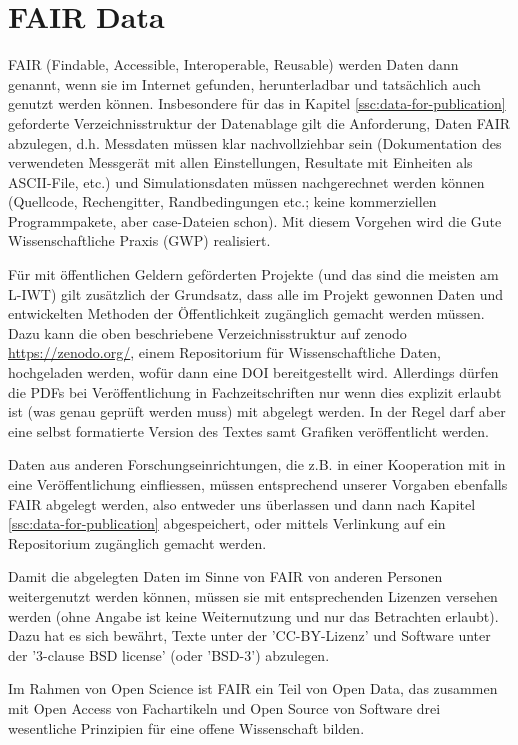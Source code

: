 \section{FAIR Data}

FAIR (Findable, Accessible, Interoperable, Reusable) werden Daten dann genannt, wenn sie im Internet gefunden, herunterladbar und tatsächlich auch genutzt werden können. Insbesondere für das in Kapitel \ref{ssc:data-for-publication} geforderte Verzeichnisstruktur der Datenablage gilt die Anforderung, Daten FAIR abzulegen, d.h. Messdaten müssen klar nachvollziehbar sein (Dokumentation des verwendeten Messgerät mit allen Einstellungen, Resultate mit Einheiten als ASCII-File, etc.) und Simulationsdaten müssen nachgerechnet werden können (Quellcode, Rechengitter, Randbedingungen etc.; keine kommerziellen Programmpakete, aber case-Dateien schon). Mit diesem Vorgehen wird die Gute Wissenschaftliche Praxis (GWP) realisiert.

Für mit öffentlichen Geldern geförderten Projekte (und das sind die meisten am L-IWT) gilt zusätzlich der Grundsatz, dass alle im Projekt gewonnen Daten und entwickelten Methoden der Öffentlichkeit zugänglich gemacht werden müssen. Dazu kann die oben beschriebene Verzeichnisstruktur auf zenodo \url{https://zenodo.org/}, einem Repositorium für Wissenschaftliche Daten, hochgeladen werden, wofür dann eine DOI bereitgestellt wird. Allerdings dürfen die PDFs bei Veröffentlichung in Fachzeitschriften nur wenn dies explizit erlaubt ist (was genau geprüft werden muss) mit abgelegt werden. In der Regel darf aber eine selbst formatierte Version des Textes samt Grafiken veröffentlicht werden.

Daten aus anderen Forschungseinrichtungen, die z.B. in einer Kooperation mit in eine Veröffentlichung einfliessen, müssen entsprechend unserer Vorgaben ebenfalls FAIR abgelegt werden, also entweder uns überlassen und dann nach Kapitel \ref{ssc:data-for-publication} abgespeichert, oder mittels Verlinkung auf ein Repositorium zugänglich gemacht werden.

Damit die abgelegten Daten im Sinne von FAIR von anderen Personen weitergenutzt werden können, müssen sie mit entsprechenden Lizenzen versehen werden (ohne Angabe ist keine Weiternutzung und nur das Betrachten erlaubt).
Dazu hat es sich bewährt, Texte unter der 'CC-BY-Lizenz' und Software unter der '3-clause BSD license' (oder 'BSD-3') abzulegen.

Im Rahmen von Open Science ist FAIR ein Teil von Open Data, das zusammen mit Open Access von Fachartikeln und Open Source von Software drei wesentliche Prinzipien für eine offene Wissenschaft bilden.
